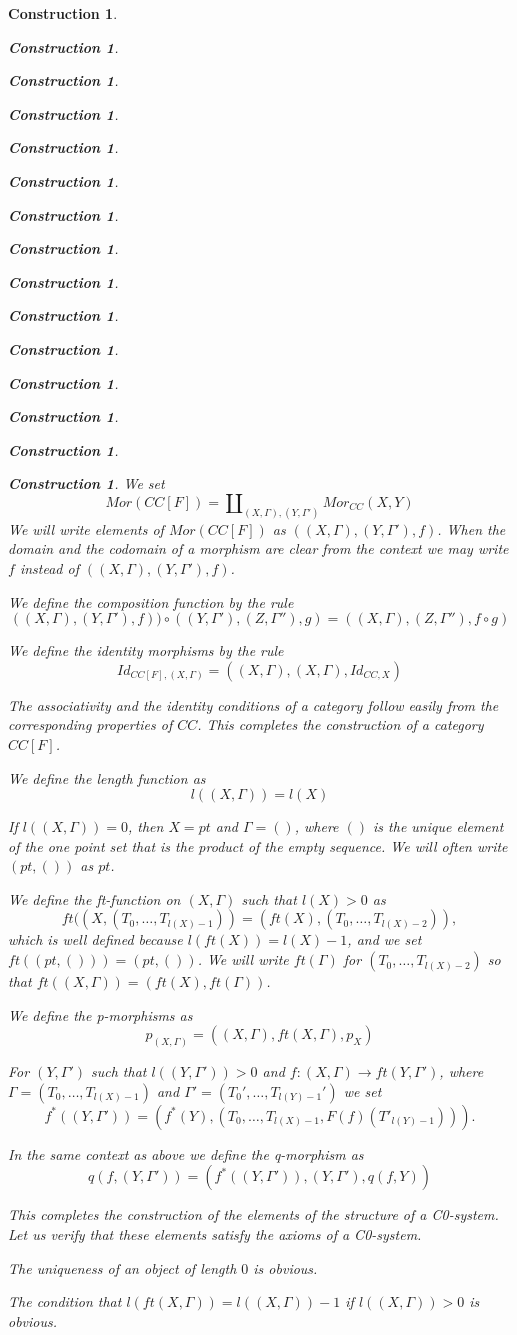 \documentclass[12pt]{amsart}
\newenvironment{eq}{\begin{equation}}{\end{equation}}
\newtheorem{construction}[proposition]{Construction}
\newcommand{\llabel}[1]{\label{#1}}
\newcommand{\sr}{\rightarrow}
\begin{document}
\begin{construction}
\begin{construction}
\begin{construction}
\begin{construction}
\begin{construction}
\begin{construction}
\begin{construction}
\begin{construction}
\begin{construction}
\begin{construction}
\begin{construction}
\begin{construction}
\begin{construction}
\begin{construction}
\begin{construction}
We set
%
$$Mor(CC[F])=\amalg_{(X,\Gamma),(Y,\Gamma')}Mor_{CC}(X,Y)$$
%
We will write elements of $Mor(CC[F])$ as $((X,\Gamma),(Y,\Gamma'),f)$. When
the domain and the codomain of a morphism are clear from the context we may
write $f$ instead of $((X,\Gamma),(Y,\Gamma'),f)$.

We define the composition function by the rule
%
$$((X,\Gamma),(Y,\Gamma'),f))\circ ((Y,\Gamma'),(Z,\Gamma''),g)=((X,\Gamma),(Z,\Gamma''),f\circ g)$$

We define the identity morphisms by the rule
%
$$Id_{CC[F],(X,\Gamma)}=((X,\Gamma),(X,\Gamma),Id_{CC,X})$$
%

The associativity and the identity conditions of a category follow easily from
the corresponding properties of $CC$. This completes the construction of a
category $CC[F]$.

We define the length function as
%
$$l((X,\Gamma))=l(X)$$

If $l((X,\Gamma))=0$, then $X=pt$ and $\Gamma=()$, where $()$ is the unique
element of the one point set that is the product of the empty sequence. We will
often write $(pt,())$ as $pt$.

We define the ft-function on $(X,\Gamma)$ such that $l(X)>0$ as 
%
$$ft((X,(T_0,\dots,T_{l(X)-1}))=(ft(X),(T_0,\dots,T_{l(X)-2})),$$
%
which is well defined because $l(ft(X))=l(X)-1$, and we set
$ft((pt,()))=(pt,())$. We will write $ft(\Gamma)$ for $(T_0,\dots,T_{l(X)-2})$
so that $ft((X,\Gamma))=(ft(X),ft(\Gamma))$.

We define the p-morphisms as 
%
$$p_{(X,\Gamma)}=((X,\Gamma),ft(X,\Gamma), p_X)$$

For $(Y,\Gamma')$ such that $l((Y,\Gamma'))>0$ and $f:(X,\Gamma)\sr ft(Y,\Gamma')$, where $\Gamma=(T_0,\dots,T_{l(X)-1})$ and $\Gamma'=(T_0',\dots,T_{l(Y)-1}')$ we set
%
\begin{eq}\llabel{2016.01.31.eq1}
f^*((Y,\Gamma'))=(f^*(Y),(T_0,\dots,T_{l(X)-1},F(f)(T'_{l(Y)-1}))).
\end{eq}%
%

In the same context as above we define the q-morphism as
%
$$q(f,(Y,\Gamma'))=(f^*((Y,\Gamma')),(Y,\Gamma'),q(f,Y))$$

This completes the construction of the elements of the structure of a C0-system. Let us verify that these elements satisfy the axioms of a C0-system. 

The uniqueness of an object of length $0$ is obvious.

The condition that $l(ft(X,\Gamma))=l((X,\Gamma))-1$ if $l((X,\Gamma))>0$ is obvious.


\end{construction}
\end{construction}
\end{construction}
\end{construction}
\end{construction}
\end{construction}
\end{construction}
\end{construction}
\end{construction}
\end{construction}
\end{construction}
\end{construction}
\end{construction}
\end{construction}
\end{construction}
\end{document}
